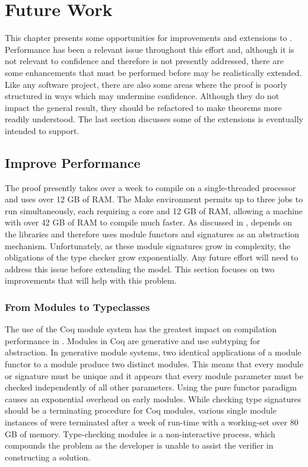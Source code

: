 \chapter{Future Work}
\label{ch:future}

This chapter presents some opportunities for improvements and extensions to \TMmodelName{}.
Performance has been a relevant issue throughout this effort and, although it is not relevant to confidence and therefore is not presently addressed, there are some enhancements that must be performed before \TMmodelName{} may be realistically extended.
Like any software project, there are also some areas where the proof is poorly structured in ways which may undermine confidence. 
Although they do not impact the general result, they should be refactored to make theorems more readily understood.
The last section discusses some of the extensions \TMmodelName{} is eventually intended to support.

\section{Improve Performance}

The \TMmodelName{} proof presently takes over a week to compile on a single-threaded processor and uses over 12 GB of RAM.
The Make environment permits up to three jobs to run simultaneously, each requiring a core and 12 GB of RAM, allowing a machine with over 42 GB of RAM to compile much faster.
As discussed in , \TMmodelName{} depends on the \COQFSet{} libraries and therefore uses module functors and signatures as an abstraction mechanism.
Unfortunately, as these module signatures grow in complexity, the obligations of the type checker grow exponentially.
Any future effort will need to address this issue before extending the model.
This section focuses on two improvements that will help with this problem.

\subsection{From Modules to Typeclasses}

The use of the Coq module system has the greatest impact on compilation performance in \TMmodelName{}.
Modules in Coq are generative and use subtyping for abstraction.
In generative module systems, two identical applications of a module functor to a module produce two distinct modules.
This means that every module or signature must be unique and it appears that every module parameter must be checked independently of all other parameters.
Using the pure functor paradigm causes an exponential overhead on early modules.
While checking type signatures should be a terminating procedure for Coq modules, various single module instances of \TMmodelName{} were terminated after a week of run-time with a working-set over 80 GB of memory.
Type-checking modules is a non-interactive process, which compounds the problem as the developer is unable to assist the verifier in constructing a solution.

